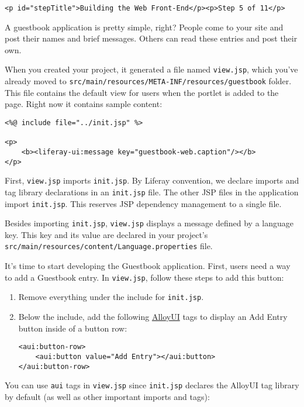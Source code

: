 \begin{verbatim}
<p id="stepTitle">Building the Web Front-End</p><p>Step 5 of 11</p>
\end{verbatim}

A guestbook application is pretty simple, right? People come to your
site and post their names and brief messages. Others can read these
entries and post their own.

When you created your project, it generated a file named
\texttt{view.jsp}, which you've already moved to
\texttt{src/main/resources/META-INF/resources/guestbook} folder. This
file contains the default view for users when the portlet is added to
the page. Right now it contains sample content:

\begin{verbatim}
<%@ include file="../init.jsp" %>

<p>
    <b><liferay-ui:message key="guestbook-web.caption"/></b>
</p>
\end{verbatim}

First, \texttt{view.jsp} imports \texttt{init.jsp}. By Liferay
convention, we declare imports and tag library declarations in an
\texttt{init.jsp} file. The other JSP files in the application import
\texttt{init.jsp}. This reserves JSP dependency management to a single
file.

Besides importing \texttt{init.jsp}, \texttt{view.jsp} displays a
message defined by a language key. This key and its value are declared
in your project's
\texttt{src/main/resources/content/Language.properties} file.

It's time to start developing the Guestbook application. First, users
need a way to add a Guestbook entry. In \texttt{view.jsp}, follow these
steps to add this button:

\begin{enumerate}
\def\labelenumi{\arabic{enumi}.}
\item
  Remove everything under the include for \texttt{init.jsp}.
\item
  Below the include, add the following
  \href{http://alloyui.com/}{AlloyUI} tags to display an Add Entry
  button inside of a button row:

\begin{verbatim}
<aui:button-row>
    <aui:button value="Add Entry"></aui:button>
</aui:button-row>
\end{verbatim}
\end{enumerate}

You can use \texttt{aui} tags in \texttt{view.jsp} since
\texttt{init.jsp} declares the AlloyUI tag library by default (as well
as other important imports and tags):

